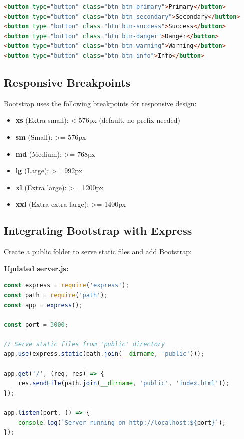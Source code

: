 \documentclass[12pt,a4paper]{article}
\begin{document}
\begin{lstlisting}[language=HTML]
<button type="button" class="btn btn-primary">Primary</button>
<button type="button" class="btn btn-secondary">Secondary</button>
<button type="button" class="btn btn-success">Success</button>
<button type="button" class="btn btn-danger">Danger</button>
<button type="button" class="btn btn-warning">Warning</button>
<button type="button" class="btn btn-info">Info</button>
\end{lstlisting}

\subsection{Responsive Breakpoints}

Bootstrap uses the following breakpoints for responsive design:

\begin{itemize}
    \item \textbf{xs} (Extra small): < 576px (default, no prefix needed)
    \item \textbf{sm} (Small): \textgreater= 576px
    \item \textbf{md} (Medium): \textgreater= 768px
    \item \textbf{lg} (Large): \textgreater= 992px
    \item \textbf{xl} (Extra large): \textgreater= 1200px
    \item \textbf{xxl} (Extra extra large): \textgreater= 1400px
\end{itemize}

\subsection{Integrating Bootstrap with Express}

Create a public folder to serve static files and add Bootstrap:

\textbf{Updated server.js:}

\begin{lstlisting}[language=JavaScript]
const express = require('express');
const path = require('path');
const app = express();

const port = 3000;

// Serve static files from 'public' directory
app.use(express.static(path.join(__dirname, 'public')));

app.get('/', (req, res) => {
    res.sendFile(path.join(__dirname, 'public', 'index.html'));
});

app.listen(port, () => {
    console.log(`Server running on http://localhost:${port}`);
});
\end{lstlisting}
\end{document}
